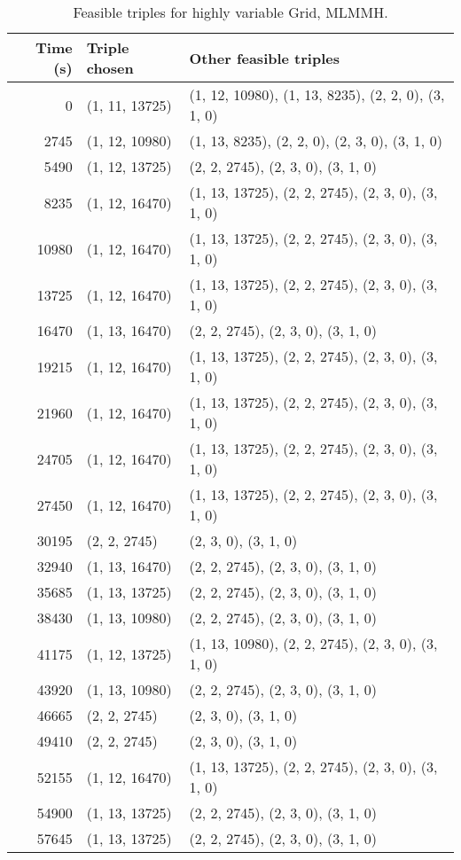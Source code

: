 \begin{table}
\caption{Feasible triples for highly variable Grid, MLMMH.} \label{tbl1}
\begin{tabularx}{6.5 in}{r l X}
\hline {{Time (s)}} & {{Triple chosen}} & {{Other feasible triples}} \\ \hline
0 & (1, 11, 13725) & (1, 12, 10980), (1, 13, 8235), (2, 2, 0), (3, 1, 0) \\
2745 & (1, 12, 10980) & (1, 13, 8235), (2, 2, 0), (2, 3, 0), (3, 1, 0) \\
5490 & (1, 12, 13725) & (2, 2, 2745), (2, 3, 0), (3, 1, 0) \\
8235 & (1, 12, 16470) & (1, 13, 13725), (2, 2, 2745), (2, 3, 0), (3, 1, 0) \\
10980 & (1, 12, 16470) & (1, 13, 13725), (2, 2, 2745), (2, 3, 0), (3, 1, 0) \\
13725 & (1, 12, 16470) & (1, 13, 13725), (2, 2, 2745), (2, 3, 0), (3, 1, 0) \\
16470 & (1, 13, 16470) & (2, 2, 2745), (2, 3, 0), (3, 1, 0) \\
19215 & (1, 12, 16470) & (1, 13, 13725), (2, 2, 2745), (2, 3, 0), (3, 1, 0) \\
21960 & (1, 12, 16470) & (1, 13, 13725), (2, 2, 2745), (2, 3, 0), (3, 1, 0) \\
24705 & (1, 12, 16470) & (1, 13, 13725), (2, 2, 2745), (2, 3, 0), (3, 1, 0) \\
27450 & (1, 12, 16470) & (1, 13, 13725), (2, 2, 2745), (2, 3, 0), (3, 1, 0) \\
30195 & (2, 2, 2745) & (2, 3, 0), (3, 1, 0) \\
32940 & (1, 13, 16470) & (2, 2, 2745), (2, 3, 0), (3, 1, 0) \\
35685 & (1, 13, 13725) & (2, 2, 2745), (2, 3, 0), (3, 1, 0) \\
38430 & (1, 13, 10980) & (2, 2, 2745), (2, 3, 0), (3, 1, 0) \\
41175 & (1, 12, 13725) & (1, 13, 10980), (2, 2, 2745), (2, 3, 0), (3, 1, 0) \\
43920 & (1, 13, 10980) & (2, 2, 2745), (2, 3, 0), (3, 1, 0) \\
46665 & (2, 2, 2745) & (2, 3, 0), (3, 1, 0) \\
49410 & (2, 2, 2745) & (2, 3, 0), (3, 1, 0) \\
52155 & (1, 12, 16470) & (1, 13, 13725), (2, 2, 2745), (2, 3, 0), (3, 1, 0) \\
54900 & (1, 13, 13725) & (2, 2, 2745), (2, 3, 0), (3, 1, 0) \\
57645 & (1, 13, 13725) & (2, 2, 2745), (2, 3, 0), (3, 1, 0) \\

\end{tabularx}
\end{table}
